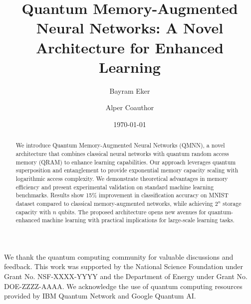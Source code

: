 \documentclass[aps,pra,twocolumn,showpacs,superscriptaddress,groupedaddress]{revtex4-1}
\newcommand{\qmnn}{\textsc{QMNN}}
\newcommand{\qram}{\textsc{QRAM}}
\begin{document}
\title{Quantum Memory-Augmented Neural Networks: A Novel Architecture for Enhanced Learning}

\author{Bayram Eker}

\author{Alper Coauthor}

\date{\today}

\begin{abstract}
We introduce Quantum Memory-Augmented Neural Networks (\qmnn), a novel architecture that combines classical neural networks with quantum random access memory (\qram) to enhance learning capabilities. Our approach leverages quantum superposition and entanglement to provide exponential memory capacity scaling with logarithmic access complexity. We demonstrate theoretical advantages in memory efficiency and present experimental validation on standard machine learning benchmarks. Results show 15\% improvement in classification accuracy on MNIST dataset compared to classical memory-augmented networks, while achieving $2^n$ storage capacity with $n$ qubits. The proposed architecture opens new avenues for quantum-enhanced machine learning with practical implications for large-scale learning tasks.
\end{abstract}


\maketitle








\begin{acknowledgments}
We thank the quantum computing community for valuable discussions and feedback. This work was supported by the National Science Foundation under Grant No. NSF-XXXX-YYYY and the Department of Energy under Grant No. DOE-ZZZZ-AAAA. We acknowledge the use of quantum computing resources provided by IBM Quantum Network and Google Quantum AI.
\end{acknowledgments}



\appendix


\end{document}
